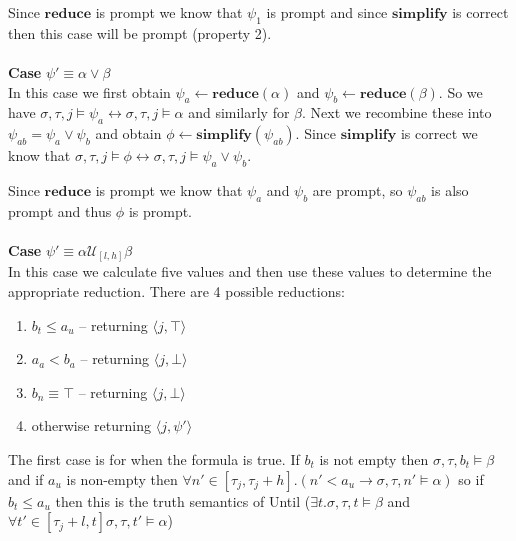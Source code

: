 \documentclass[10pt,a4paper]{article}
\newcommand{\rp}[2]{\ensuremath{\langle #1, #2 \rangle}}
\begin{document}
Since $\mathbf{reduce}$ is prompt we know that $\psi_1$ is prompt and since $\mathbf{simplify}$ is correct then this case will be prompt (property 2).
\\ \\ %
\noindent \textbf{Case} $\psi' \equiv \alpha \vee \beta$ \\
In this case we first obtain $\psi_a \leftarrow \mathbf{reduce}(\alpha)$ and $\psi_b \leftarrow \mathbf{reduce}(\beta)$.
So we have $\sigma, \tau, j \vDash \psi_a \leftrightarrow \sigma, \tau, j \vDash \alpha$ and similarly for $\beta$.
Next we recombine these into $\psi_{ab} = \psi_a \vee \psi_b$ and obtain $\phi \leftarrow \mathbf{simplify}(\psi_{ab})$.
Since $\mathbf{simplify}$ is correct we know that $\sigma, \tau, j \vDash \phi \leftrightarrow \sigma, \tau, j \vDash \psi_a \vee \psi_b$.

Since $\mathbf{reduce}$ is prompt we know that $\psi_a$ and $\psi_b$ are prompt, so $\psi_{ab}$ is also prompt and thus $\phi$ is prompt.
\\ \\ %
\noindent \textbf{Case} $\psi' \equiv \alpha \mathcal{U}_{[l,h]} \beta$ \\
In this case we calculate five values and then use these values to determine the appropriate reduction. There are 4 possible reductions:
\begin{enumerate}
\item $b_t \leq a_u$ -- returning $\rp{j}{\top}$
\item $a_a < b_a$ -- returning $\rp{j}{\bot}$
\item $b_n \equiv \top$ -- returning $\rp{j}{\bot}$
\item otherwise returning $\rp{j}{\psi'}$
\end{enumerate}

The first case is for when the formula is true. If $b_t$ is not empty then $\sigma, \tau, b_t \vDash \beta$ and 
if $a_u$ is non-empty then 
	$\forall n' \in [\tau_j,\tau_j+h].(n' < a_u \rightarrow \sigma, \tau, n' \vDash \alpha)$
	so if $b_t \leq a_u$ then this is the truth semantics of Until ($\exists t. \sigma, \tau, t \vDash \beta$ and $\forall t' \in [\tau_j+l,t] \sigma, \tau, t' \vDash \alpha$)
\end{document}
